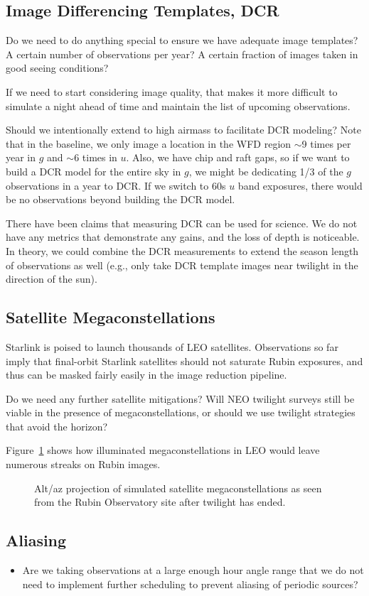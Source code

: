 \subsection{Image Differencing Templates, DCR}

Do we need to do anything special to ensure we have adequate image templates? A certain number of observations per year? A certain fraction of images taken in good seeing conditions? 

If we need to start considering image quality, that makes it more difficult to simulate a night ahead of time and maintain the list of upcoming observations.

Should we intentionally extend to high airmass to facilitate DCR modeling? Note that in the baseline, we only image a location in the WFD region $\sim$9 times per year in $g$ and $\sim$6 times in $u$. Also, we have chip and raft gaps, so if we want to build a DCR model for the entire sky in $g$, we might be dedicating 1/3 of the $g$ observations in a year to DCR. If we switch to 60s $u$ band exposures, there would be no observations beyond building the DCR model. 

There have been claims that measuring DCR can be used for science.  We do not have any metrics that demonstrate any gains, and the loss of depth is noticeable. In theory, we could combine the DCR measurements to extend the season length of observations as well (e.g., only take DCR template images near twilight in the direction of the sun).

\subsection{Satellite Megaconstellations}

Starlink is poised to launch thousands of LEO satellites. Observations so far imply that final-orbit Starlink satellites should not saturate Rubin exposures, and thus can be masked fairly easily in the image reduction pipeline. 

Do we need any further satellite mitigations? Will NEO twilight surveys still be viable in the presence of megaconstellations, or should we use twilight strategies that avoid the horizon?

Figure~\ref{fig:megasat} shows how illuminated megaconstellations in LEO would leave numerous streaks on Rubin images.

\begin{figure}
\caption{Alt/az projection of simulated satellite megaconstellations as seen from the Rubin Observatory site after twilight has ended. } \label{fig:megasat}
\end{figure}

\subsection{Aliasing}

\begin{itemize}
    \item{Are we taking observations at a large enough hour angle range that we do not need to implement further scheduling to prevent aliasing of periodic sources?}
\end{itemize}
